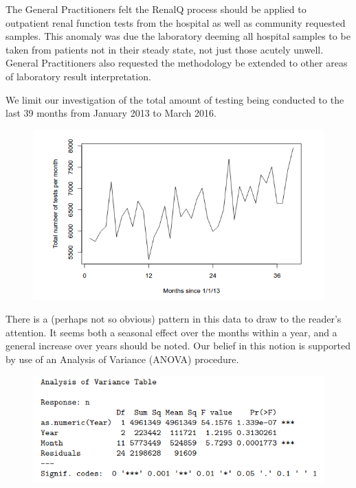 \documentclass[11pt]{article}
\begin{document}
The General Practitioners felt the RenalQ process should be applied to outpatient renal function tests from the hospital as well as community requested samples. This anomaly was due the laboratory deeming all hospital samples to be taken from patients not in their steady state, not just those acutely unwell. General Practitioners also requested the methodology be extended to other areas of laboratory result interpretation.

We limit our investigation of the total amount of testing being conducted to the last 39 months from January 2013 to March 2016.\\

\begin{figure}[htp]
\centering
\includegraphics[scale=0.50]{Fig1.png}
\caption{}
\label{}
\end{figure}

There is a (perhaps not so obvious) pattern in this data to draw to the reader's attention. It seems both a seasonal effect over the months within a year, and a general increase over years should be noted.  Our belief in this notion is supported by use of an Analysis of Variance (ANOVA) procedure. \\

\begin{figure}[htp]
\centering
\includegraphics[scale=0.50]{fig2.png}
\caption{}
\label{}
\end{figure}
\end{document}

